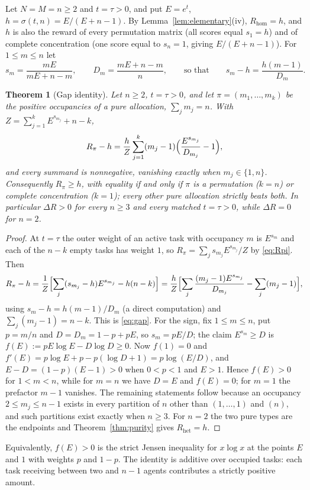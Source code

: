 \documentclass[11pt]{article}
\theoremstyle{plain}
\newtheorem{theorem}{Theorem}[section]
\theoremstyle{definition}
\theoremstyle{remark}
\newcommand{\Rhet}{R_{\mathrm{het}}}
\newcommand{\Rhom}{R_{\mathrm{hom}}}
\newcommand{\sig}{\sigma}
\begin{document}
Let $N=M=n\ge2$ and $t=\tau>0$, and put $E=e^t$, $h=\sig(t,n)=E/(E+n-1)$. By Lemma~\ref{lem:elementary}(iv), $\Rhom=h$, and $h$ is also the reward of every permutation matrix (all scores equal $s_1=h$) and of complete concentration (one score equal to $s_n=1$, giving $E/(E+n-1)$). For $1\le m\le n$ let
\[
 s_m=\frac{mE}{mE+n-m},\qquad D_m=\frac{mE+n-m}{n},\qquad\text{so that}\qquad s_m-h=\frac{h(m-1)}{D_m}.
\]

\begin{theorem}[Gap identity]\label{thm:gap}
Let $n\ge2$, $t=\tau>0$, and let $\pi=(m_1,\dots,m_k)$ be the positive occupancies of a pure allocation, $\sum_jm_j=n$. With $Z=\sum_{j=1}^kE^{s_{m_j}}+n-k$,
\begin{equation}\label{eq:gap}
 R_\pi-h=\frac hZ\sum_{j=1}^k(m_j-1)\Bigl(\frac{E^{s_{m_j}}}{D_{m_j}}-1\Bigr),
\end{equation}
and every summand is nonnegative, vanishing exactly when $m_j\in\{1,n\}$. Consequently $R_\pi\ge h$, with equality if and only if $\pi$ is a permutation ($k=n$) or complete concentration ($k=1$); every other pure allocation strictly beats both. In particular $\Delta R>0$ for every $n\ge3$ and every matched $t=\tau>0$, while $\Delta R=0$ for $n=2$.
\end{theorem}

\begin{proof}
At $t=\tau$ the outer weight of an active task with occupancy $m$ is $E^{s_m}$ and each of the $n-k$ empty tasks has weight $1$, so $R_\pi=\sum_js_{m_j}E^{s_{m_j}}/Z$ by \eqref{eq:Rpi}. Then
\[
 R_\pi-h=\frac1Z\Bigl[\sum_j(s_{m_j}-h)E^{s_{m_j}}-h(n-k)\Bigr]
 =\frac hZ\Bigl[\sum_j\frac{(m_j-1)E^{s_{m_j}}}{D_{m_j}}-\sum_j(m_j-1)\Bigr],
\]
using $s_m-h=h(m-1)/D_m$ (a direct computation) and $\sum_j(m_j-1)=n-k$. This is \eqref{eq:gap}. For the sign, fix $1\le m\le n$, put $p=m/n$ and $D=D_m=1-p+pE$, so $s_m=pE/D$; the claim $E^{s_m}\ge D$ is $f(E):=pE\log E-D\log D\ge0$. Now $f(1)=0$ and $f'(E)=p\log E+p-p(\log D+1)=p\log(E/D)$, and $E-D=(1-p)(E-1)>0$ when $0<p<1$ and $E>1$. Hence $f(E)>0$ for $1<m<n$, while for $m=n$ we have $D=E$ and $f(E)=0$; for $m=1$ the prefactor $m-1$ vanishes. The remaining statements follow because an occupancy $2\le m_j\le n-1$ exists in every partition of $n$ other than $(1,\dots,1)$ and $(n)$, and such partitions exist exactly when $n\ge3$. For $n=2$ the two pure types are the endpoints and Theorem~\ref{thm:purity} gives $\Rhet=h$.
\end{proof}

Equivalently, $f(E)>0$ is the strict Jensen inequality for $x\log x$ at the points $E$ and $1$ with weights $p$ and $1-p$. The identity is additive over occupied tasks: each task receiving between two and $n-1$ agents contributes a strictly positive amount.
\end{document}
